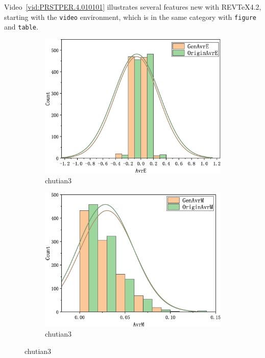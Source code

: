 \documentclass[%
reprint,
amsmath,amssymb,
aps,
]{revtex4-2}
\begin{document}
		Video~\ref{vid:PRSTPER.4.010101} 
		illustrates several features new with REV\TeX4.2,
		starting with the \texttt{video} environment, which is in the same category with
		\texttt{figure} and \texttt{table}.%
	\begin{figure}[htbp]
	\centering
	\begin{subfigure}{0.4\linewidth}
		\centering
		\includegraphics[scale=0.1]{16mix32_32_T_3_E}
		\caption{chutian3}
		\label{chutian3}%
	\end{subfigure}
	\centering
	\begin{subfigure}{0.4\linewidth}
		\centering
		\includegraphics[scale=0.1]{16mix32_32_T_3_M}
		\caption{chutian3}
		\label{chutian3}%

\end{subfigure}
\end{figure}
\end{document}

